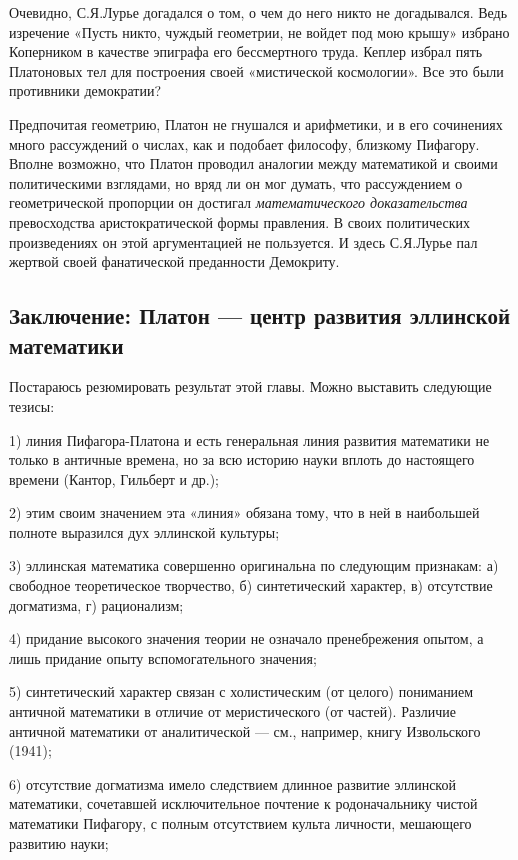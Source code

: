 Очевидно,  С.Я.Лурье  догадался  о  том,   о  чем  до  него  никто  не
догадывался. Ведь изречение «Пусть  никто, чуждый геометрии, не войдет
под мою крышу» избрано Коперником в качестве эпиграфа его бессмертного
труда.  Кеплер  избрал  пять   Платоновых  тел  для  построения  своей
«мистической космологии». Все это были противники демократии?

Предпочитая  геометрию,  Платон не  гнушался  и  арифметики, и  в  его
сочинениях  много  рассуждений  о  числах, как  и  подобает  философу,
близкому Пифагору. Вполне возможно, что Платон проводил аналогии между
математикой  и  своими политическими  взглядами,  но  вряд ли  он  мог
думать,  что  рассуждением  о  геометрической  пропорции  он  достигал
\emph{математического доказательства}  превосходства аристократической
формы   правления.  В   своих  политических   произведениях  он   этой
аргументацией  не  пользуется. И  здесь  С.Я.Лурье  пал жертвой  своей
фанатической преданности Демокриту.

\subsection{Заключение:   Платон   ---    центр   развития   эллинской
математики}

Постараюсь   резюмировать  результат   этой  главы.   Можно  выставить
следующие тезисы:

1) линия Пифагора-Платона и есть генеральная линия развития математики
не  только в  античные  времена, но  за всю  историю  науки вплоть  до
настоящего времени (Кантор, Гильберт и др.);

2)  этим  своим значением  эта  «линия»  обязана  тому,  что в  ней  в
наибольшей полноте выразился дух эллинской культуры;

3) эллинская математика совершенно оригинальна по следующим признакам:
а) свободное  теоретическое творчество, б) синтетический  характер, в)
отсутствие догматизма, г) рационализм;

4) придание высокого значения теории не означало пренебрежения опытом,
а лишь придание опыту вспомогательного значения;

5)  синтетический   характер  связан   с  холистическим   (от  целого)
пониманием  античной  математики  в   отличие  от  меристического  (от
частей).  Различие  античной  математики  от  аналитической  ---  см.,
например, книгу Извольского (1941);

6) отсутствие  догматизма имело следствием длинное  развитие эллинской
математики, сочетавшей исключительное почтение к родоначальнику чистой
математики Пифагору,  с полным отсутствием культа  личности, мешающего
развитию науки;


